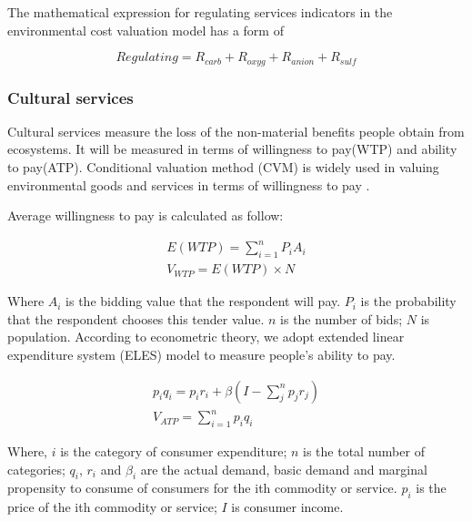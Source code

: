 \documentclass{mcmthesis}
\begin{document}
				The mathematical expression for regulating services indicators in the environmental cost valuation model has a form of
				
				\begin{equation}
				Regulating = R_{carb} + R _ { oxyg } + R_{anion} + R_{sulf}
				\end{equation}
				
			\subsubsection{Cultural services}
			
				Cultural services measure the loss of the non-material benefits people obtain from ecosystems. It will be measured in terms of willingness to pay(WTP) and ability to pay(ATP). Conditional valuation method (CVM) is widely used in valuing environmental goods and services in terms of willingness to pay \cite{mitchell2013using}.
				
				Average willingness to pay is calculated as follow:
				
				\begin{equation}
					\begin{array}{ l } 
					{E ( W T P ) = \sum _ { i = 1 } ^ { n } P _ { i } A _ { i }}\\
					{V _ { W T P } = E ( W T P ) \times N}
					\end{array}
				\end{equation}
				
				Where $A_i$ is the bidding value that the respondent will pay. $P_i$ is the probability that the respondent chooses this tender value. $n$ is the number of bids; $N$ is population.
				According to econometric theory, we adopt extended linear expenditure system (ELES) model to measure people’s ability to pay.
				
				\begin{equation}
				\begin{array} { l } { p _ { i } q _ { i } = p _ { i } r _ { i } + \beta \left( I - \sum _ { j } ^ { n } p _ { j } r _ { j } \right) } \\ { V _ { A T P } = \sum _ { i = 1 } ^ { n } p _ { i } q _ { i } } \end{array}
				\end{equation}
				
				
				
				Where, $i$ is the category of consumer expenditure; $n$ is the total number of categories; $q_i$, $r_i$ and $β_i$ are the actual demand, basic demand and marginal propensity to consume of consumers for the ith commodity or service.  $p_i$ is the price of the ith commodity or service; $I$ is consumer income.
				
\end{document}
